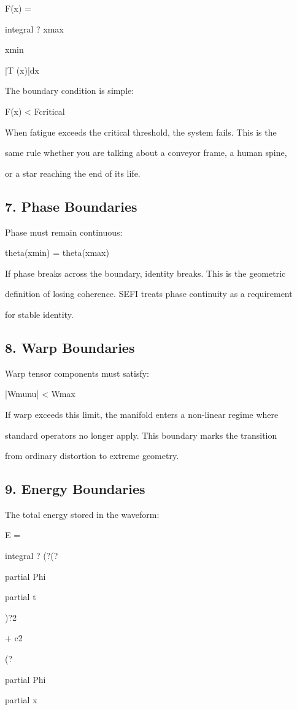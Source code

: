 \documentclass[10pt]{article}
\begin{document}
F(x) =

integral ? xmax

xmin

|T (x)|dx

The boundary condition is simple:

F(x) < Fcritical

When fatigue exceeds the critical threshold, the system fails. This is the

same rule whether you are talking about a conveyor frame, a human spine,

or a star reaching the end of its life.

\subsection*{7. Phase Boundaries}
Phase must remain continuous:

theta(xmin) = theta(xmax)

If phase breaks across the boundary, identity breaks. This is the geometric

definition of losing coherence. SEFI treats phase continuity as a requirement

for stable identity.

\subsection*{8. Warp Boundaries}
Warp tensor components must satisfy:

|Wmunu| < Wmax

If warp exceeds this limit, the manifold enters a non-linear regime where

standard operators no longer apply. This boundary marks the transition

from ordinary distortion to extreme geometry.

\subsection*{9. Energy Boundaries}
The total energy stored in the waveform:

E =

integral ? (?(?

partial Phi

partial t

)?2

+ c2

(?

partial Phi

partial x
\end{document}
